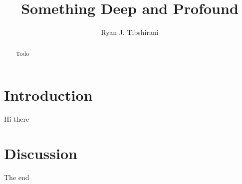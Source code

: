 \documentclass{article}
\title{Something Deep and Profound}
\author{Ryan J. Tibshirani}
\date{}
\begin{document}
\maketitle

\begin{abstract}
Todo 
\end{abstract}

\section{Introduction} 

Hi there 

\section{Discussion} 

The end


      
\end{document}
